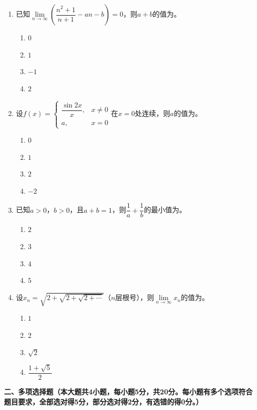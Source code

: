 \documentclass[12pt, a4paper]{ctexart}
\newcommand{\blank}[1]{\underline{\hspace{#1}}}
\begin{document}
\begin{enumerate}
\item 已知$\lim\limits_{n\to\infty}\left(\dfrac{n^2+1}{n+1}-an-b\right)=0$，则$a+b$的值为\blank{3cm}。
\begin{enumerate}[label=\Alph*.]
\item $0$
\item $1$
\item $-1$
\item $2$
\end{enumerate}

\item 设$f(x)=\begin{cases} \dfrac{\sin 2x}{x}, & x\neq 0 \\ a, & x=0 \end{cases}$在$x=0$处连续，则$a$的值为\blank{3cm}。
\begin{enumerate}[label=\Alph*.]
\item $0$
\item $1$
\item $2$
\item $-2$
\end{enumerate}

\item 已知$a>0$，$b>0$，且$a+b=1$，则$\dfrac{1}{a}+\dfrac{1}{b}$的最小值为\blank{3cm}。
\begin{enumerate}[label=\Alph*.]
\item $2$
\item $3$
\item $4$
\item $5$
\end{enumerate}

\item 设$x_n=\sqrt{2+\sqrt{2+\sqrt{2+\cdots}}}$（$n$层根号），则$\lim\limits_{n\to\infty}x_n$的值为\blank{3cm}。
\begin{enumerate}[label=\Alph*.]
\item $1$
\item $2$
\item $\sqrt{2}$
\item $\dfrac{1+\sqrt{5}}{2}$
\end{enumerate}
\end{enumerate}

\vspace{1em}

\noindent\textbf{二、多项选择题（本大题共4小题，每小题5分，共20分。每小题有多个选项符合题目要求，全部选对得5分，部分选对得2分，有选错的得0分。）}
\end{document}
